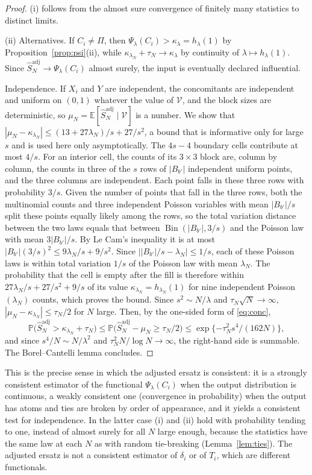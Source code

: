 \documentclass[11pt,a4paper]{article}
\theoremstyle{definition}
\theoremstyle{remark}
\newcommand{\E}{\mathbb{E}}
\newcommand{\Prob}{\mathbb{P}}
\newcommand{\cV}{\mathcal{V}}
\newcommand{\Sadj}{\hat S^{\mathrm{adj}}_N}
\newcommand{\Bin}{\operatorname{Bin}}
\begin{document}
\begin{proof}
(i) follows from the almost sure convergence of finitely many statistics to distinct limits.

(ii) Alternatives. If $C_i\neq\Pi$, then $\Psi_\lambda(C_i)>\kappa_\lambda=h_\lambda(1)$ by Proposition~\ref{prop:psi}(ii), while $\kappa_{\lambda_N}+\tau_N\to\kappa_\lambda$ by continuity of $\lambda\mapsto h_\lambda(1)$. Since $\Sadj\to\Psi_\lambda(C_i)$ almost surely, the input is eventually declared influential.

Independence. If $X_i$ and $Y$ are independent, the concomitants are independent and uniform on $(0,1)$ whatever the value of $\cV$, and the block sizes are deterministic, so $\mu_N=\E[\Sadj\mid\cV]$ is a number. We show that $|\mu_N-\kappa_{\lambda_N}|\le(13+27\lambda_N)/s+27/s^2$, a bound that is informative only for large $s$ and is used here only asymptotically. The $4s-4$ boundary cells contribute at most $4/s$. For an interior cell, the counts of its $3\times3$ block are, column by column, the counts in three of the $s$ rows of $|B_{b'}|$ independent uniform points, and the three columns are independent. Each point falls in these three rows with probability $3/s$. Given the number of points that fall in the three rows, both the multinomial counts and three independent Poisson variables with mean $|B_{b'}|/s$ split these points equally likely among the rows, so the total variation distance between the two laws equals that between $\Bin(|B_{b'}|,3/s)$ and the Poisson law with mean $3|B_{b'}|/s$. By Le Cam's inequality \citep[Chapter~1]{barbour1992} it is at most $|B_{b'}|(3/s)^2\le9\lambda_N/s+9/s^2$. Since $\big||B_{b'}|/s-\lambda_N\big|\le1/s$, each of these Poisson laws is within total variation $1/s$ of the Poisson law with mean $\lambda_N$. The probability that the cell is empty after the fill is therefore within $27\lambda_N/s+27/s^2+9/s$ of its value $\kappa_{\lambda_N}=h_{\lambda_N}(1)$ for nine independent Poisson$(\lambda_N)$ counts, which proves the bound. Since $s^2\sim N/\lambda$ and $\tau_N\sqrt N\to\infty$, $|\mu_N-\kappa_{\lambda_N}|\le\tau_N/2$ for $N$ large. Then, by the one-sided form of \eqref{eq:conc},
\[
\Prob\big(\Sadj>\kappa_{\lambda_N}+\tau_N\big)\le\Prob\big(\Sadj-\mu_N\ge\tau_N/2\big)\le\exp\{-\tau_N^2s^4/(162N)\},
\]
and since $s^4/N\sim N/\lambda^2$ and $\tau_N^2N/\log N\to\infty$, the right-hand side is summable. The Borel--Cantelli lemma concludes.
\end{proof}

This is the precise sense in which the adjusted ersatz is consistent: it is a strongly consistent estimator of the functional $\Psi_\lambda(C_i)$ when the output distribution is continuous, a weakly consistent one (convergence in probability) when the output has atoms and ties are broken by order of appearance, and it yields a consistent test for independence. In the latter case (i) and (ii) hold with probability tending to one, instead of almost surely for all $N$ large enough, because the statistics have the same law at each $N$ as with random tie-breaking (Lemma~\ref{lem:ties}). The adjusted ersatz is not a consistent estimator of $\delta_i$ or of $T_i$, which are different functionals.
\end{document}

